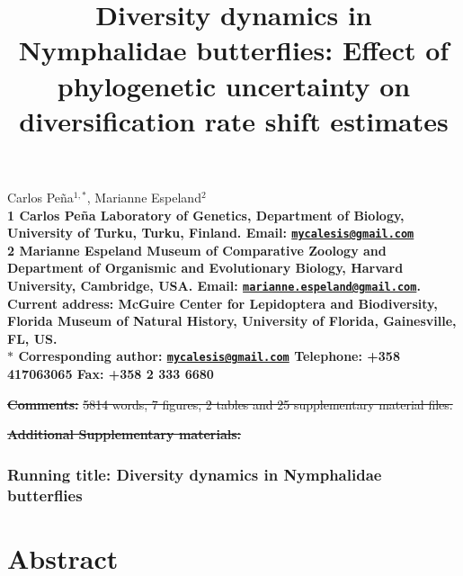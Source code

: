 \documentclass[10pt]{article}
\date{}
\providecommand{\DIFdeltex}[1]{{\protect\color{red}\sout{#1}}}                      %
\providecommand{\DIFdelbegin}{} %
\providecommand{\DIFdelend}{} %
\providecommand{\DIFdel}[1]{\texorpdfstring{\DIFdeltex{#1}}{}} %
\begin{document}
\begin{flushleft}
{\Large
    \title{Diversity dynamics in Nymphalidae butterflies: Effect of phylogenetic uncertainty on diversification rate shift estimates}
}
\maketitle
Carlos Pe\~na$^{1,\ast}$,
Marianne Espeland$^{2}$
\\
\bf{1} Carlos Pe\~na Laboratory of Genetics, Department of Biology, University of Turku, Turku, Finland. Email: \href{mailto:mycalesis@gmail.com}{\nolinkurl{mycalesis@gmail.com}}
\\
\bf{2} Marianne Espeland Museum of Comparative Zoology and Department
of Organismic and Evolutionary Biology, Harvard University, Cambridge,
USA. Email:
\href{mailto:marianne.espeland@gmail.com}{\nolinkurl{marianne.espeland@gmail.com}}.
Current address: McGuire Center for Lepidoptera and Biodiversity,
Florida Museum of Natural History, University of Florida, Gainesville,
FL, US.
\\
$\ast$ \textbf{Corresponding author:}
\href{mailto:mycalesis@gmail.com}{\nolinkurl{mycalesis@gmail.com}}
Telephone: +358 417063065 Fax: +358 2 333 6680

\DIFdelbegin \textbf{\DIFdel{Comments:}} %
\DIFdel{5814 words, 7 figures, 2 tables and 25 supplementary
material files.
}%

\textbf{\DIFdel{Additional Supplementary materials:}}
\DIFdelend \end{flushleft}




\subsubsection*{Running title: Diversity dynamics in Nymphalidae
butterflies}


\section*{Abstract}
\end{document}
